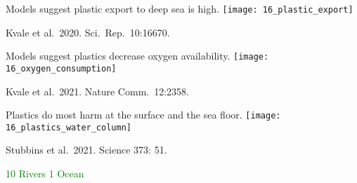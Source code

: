 \documentclass[t]{beamer}
\begin{document}
%

\begin{frame}{Models suggest plastic export to deep sea is high.}
\texttt{[image: 16\_plastic\_export]}

\tinyfill Kvale et al.\ 2020. Sci.\ Rep.\ 10:16670.

\end{frame}
%

\begin{frame}{Models suggest plastics decrease oxygen availability.}
\centering
\texttt{[image: 16\_oxygen\_consumption]}

\tinyfill Kvale et al.\ 2021. Nature Comm.\  12:2358.

\end{frame}
%


\begin{frame}{Plastics do most harm at the surface and the sea floor.}
\centering
\texttt{[image: 16\_plastics\_water\_column]}

\tinyfill Stubbins et al.\ 2021. Science 373: 51.

\end{frame}
%

{
\begin{frame}

	\vfilll
	
	\tiny \textcolor{green}{10 Rivers 1 Ocean}
\end{frame}
}
\end{document}
